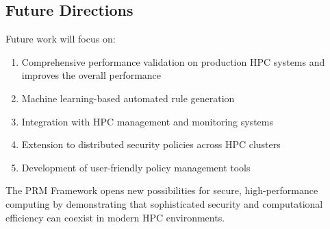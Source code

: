 \documentclass[conference]{IEEEtran}
\begin{document}
\subsection{Future Directions}
Future work will focus on:
\begin{enumerate}
\item Comprehensive performance validation on production HPC systems and improves the overall performance
\item Machine learning-based automated rule generation
\item Integration with HPC management and monitoring systems
\item Extension to distributed security policies across HPC clusters
\item Development of user-friendly policy management tools
\end{enumerate}

The PRM Framework opens new possibilities for secure, high-performance computing by demonstrating that sophisticated security and computational efficiency can coexist in modern HPC environments.
\end{document}

